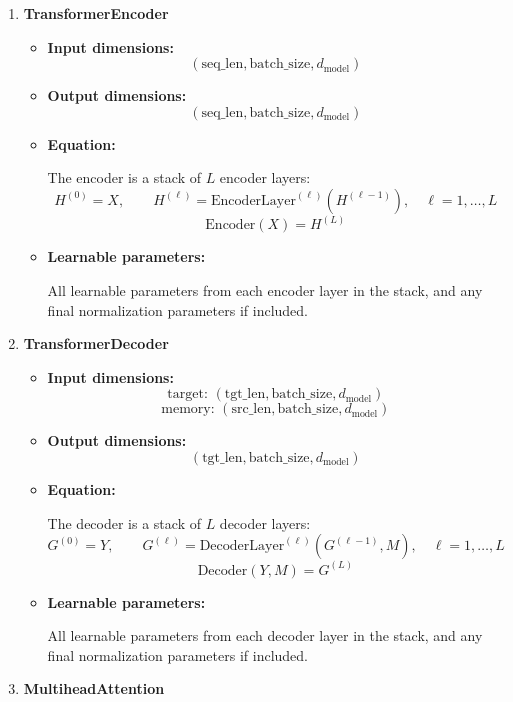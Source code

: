 \documentclass[10pt]{article}
\begin{document}
\begin{enumerate}[label=\roman*.]
\item \textbf{TransformerEncoder}

\begin{itemize}
    \item \textbf{Input dimensions:}
    \[
    (\text{seq\_len}, \text{batch\_size}, d_{\text{model}})
    \]
    \item \textbf{Output dimensions:}
    \[
    (\text{seq\_len}, \text{batch\_size}, d_{\text{model}})
    \]
    \item \textbf{Equation:}

    The encoder is a stack of $L$ encoder layers:
    \[
    H^{(0)} = X,\qquad H^{(\ell)} = \mathrm{EncoderLayer}^{(\ell)}(H^{(\ell-1)}),\quad \ell=1,\dots,L
    \]
    \[
    \mathrm{Encoder}(X)=H^{(L)}
    \]
    \item \textbf{Learnable parameters:}

    All learnable parameters from each encoder layer in the stack, and any final normalization parameters if included.
\end{itemize}

\item \textbf{TransformerDecoder}

\begin{itemize}
    \item \textbf{Input dimensions:}
    \[
    \text{target: } (\text{tgt\_len}, \text{batch\_size}, d_{\text{model}})
    \]
    \[
    \text{memory: } (\text{src\_len}, \text{batch\_size}, d_{\text{model}})
    \]
    \item \textbf{Output dimensions:}
    \[
    (\text{tgt\_len}, \text{batch\_size}, d_{\text{model}})
    \]
    \item \textbf{Equation:}

    The decoder is a stack of $L$ decoder layers:
    \[
    G^{(0)} = Y,\qquad G^{(\ell)} = \mathrm{DecoderLayer}^{(\ell)}(G^{(\ell-1)}, M),\quad \ell=1,\dots,L
    \]
    \[
    \mathrm{Decoder}(Y,M)=G^{(L)}
    \]
    \item \textbf{Learnable parameters:}

    All learnable parameters from each decoder layer in the stack, and any final normalization parameters if included.
\end{itemize}

\item \textbf{MultiheadAttention}


\end{enumerate}
\end{document}
